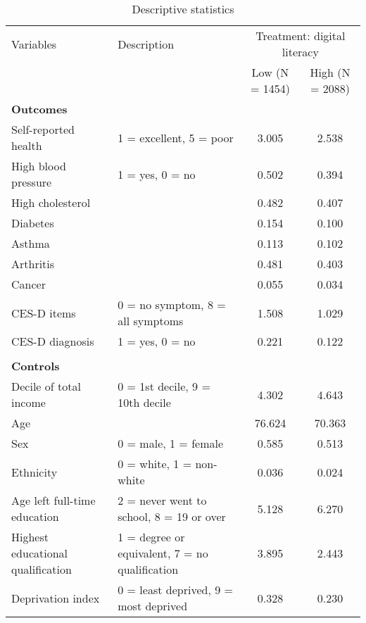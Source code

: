 \documentclass[12pt]{article}
\begin{document}
    \begin{sidewaystable}[h!]
        \centering
        \caption{Descriptive statistics}
        \label{tab:desc_stats_q1}
        \begin{tabular}{llcc}
            \toprule
            Variables & Description & \multicolumn{2}{c}{Treatment: digital literacy} \\
            & & Low (N = 1454) & High (N = 2088) \\
            \midrule
            \textbf{Outcomes} & & & \\
            Self-reported health & 1 = excellent, 5 = poor & 3.005 & 2.538 \\
            High blood pressure & 1 = yes, 0 = no & 0.502 & 0.394 \\
            High cholesterol &  & 0.482 & 0.407 \\
            Diabetes &  & 0.154 & 0.100 \\
            Asthma &  & 0.113 & 0.102 \\
            Arthritis &  & 0.481 & 0.403 \\
            Cancer &  & 0.055 & 0.034 \\
            CES-D items & 0 = no symptom, 8 = all symptoms & 1.508 & 1.029 \\
            CES-D diagnosis & 1 = yes, 0 = no & 0.221 & 0.122 \\
            & & & \\
            \textbf{Controls} & & & \\
            Decile of total income & 0 = 1st decile, 9 = 10th decile & 4.302 & 4.643 \\
            Age &  & 76.624 & 70.363 \\
            Sex & 0 = male, 1 = female & 0.585 & 0.513 \\
            Ethnicity & 0 = white, 1 = non-white & 0.036 & 0.024 \\
            Age left full-time education & 2 = never went to school, 8 = 19 or over & 5.128 & 6.270 \\
            Highest educational qualification & 1 = degree or equivalent, 7 = no qualification & 3.895 & 2.443 \\
            Deprivation index & 0 = least deprived, 9 = most deprived & 0.328 & 0.230 \\
            \bottomrule
        \end{tabular}
    \end{sidewaystable}
\end{document}

